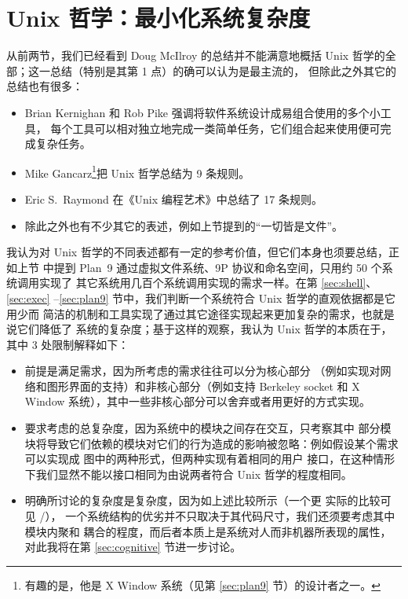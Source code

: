 \section{Unix 哲学：最小化系统复杂度}\label{sec:complex}

从前两节，我们已经看到 Doug McIlroy 的总结并不能满意地概括 Unix
哲学的全部；这一总结（特别是其第 1 点）的确可以认为是最主流的，
但除此之外其它的总结也有很多：
\begin{itemize}
\item Brian Kernighan 和 Rob Pike 强调将软件系统设计成易组合使用的多个小工具，
	每个工具可以相对独立地完成一类简单任务，它们组合起来使用便可完成复杂任务。
\item Mike Gancarz\footnote{有趣的是，他是 X Window 系统（见第
	\ref{sec:plan9} 节）的设计者之一。}把 Unix 哲学总结为 9 条规则。
\item Eric S.\ Raymond 在《Unix 编程艺术》中总结了 17 条规则。
\item 除此之外也有不少其它的表述，例如上节提到的“一切皆是文件”。
\end{itemize}
我认为对 Unix 哲学的不同表述都有一定的参考价值，但它们本身也须要总结，正如上节
中提到 Plan~9 通过虚拟文件系统、9P 协议和命名空间，只用约 50 个系统调用实现了
其它系统用几百个系统调用实现的需求一样。在第 \ref{sec:shell}、\ref{sec:exec}%
--\ref{sec:plan9} 节中，我们判断一个系统符合 Unix 哲学的直观依据都是它用少而
简洁的机制和工具实现了通过其它途径实现起来更加复杂的需求，也就是说它们降低了
系统的复杂度；基于这样的观察，我认为 Unix 哲学的本质在于，其中 3 处限制解释如下：
\begin{itemize}
\item 前提是满足需求，因为所考虑的需求往往可以分为核心部分
	（例如实现对网络和图形界面的支持）和非核心部分（例如支持 Berkeley socket
	和 X Window 系统），其中一些非核心部分可以舍弃或者用更好的方式实现。
\item 要求考虑的总复杂度，因为系统中的模块之间存在交互，只考察其中
	部分模块将导致它们依赖的模块对它们的行为造成的影响被忽略：例如假设某个需求
	可以实现成 \parencite{litt2014a} 图中的两种形式，但两种实现有着相同的用户
	接口，在这种情形下我们显然不能以接口相同为由说两者符合 Unix 哲学的程度相同。
\item 明确所讨论的复杂度是复杂度，因为如上述比较所示（一个更
	实际的比较可见 \parencite{github:acmetiny}/\parencite{gitlab:emca}），
	一个系统结构的优劣并不只取决于其代码尺寸，我们还须要考虑其中模块内聚和
	耦合的程度，而后者本质上是系统对人而非机器所表现的属性，对此我将在第
	\ref{sec:cognitive} 节进一步讨论。
\end{itemize}


